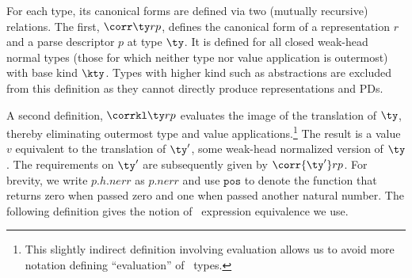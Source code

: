 


For each \ddc{} type, its canonical forms are defined via
two (mutually recursive) relations.  The first, $\corr \ty r p$,
defines the canonical form of a representation $r$ and a parse
descriptor $p$ at type $\ty$.  It is defined for all closed weak-head normal
types (those for which neither type nor value application
is outermost) with base kind $\kty$.  Types with higher kind such as
abstractions are excluded from this definition as they cannot directly
produce representations and PDs.  

A second definition, $\corrkl \ty r p$ evaluates the image of
the translation of $\ty$, thereby eliminating outermost type and
value applications.\footnote{This slightly indirect
definition involving \fomega evaluation 
allows us to avoid more notation defining ``evaluation''
of \ddc\ types.}  The result is a value $v$ equivalent to the
translation of $\ty'$, some weak-head
normalized version of $\ty$.  The requirements on $\ty'$ are subsequently 
given by $\corr {\ty'} r p$.  For brevity, we write $p.h.{nerr}$ as
$p.{nerr}$ and use $\mathtt{pos}$ to denote the function that
returns zero when passed zero and one when passed another natural number.
The following definition gives the notion of \fomega\ expression equivalence
we use.


